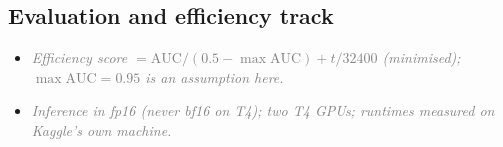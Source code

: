 \documentclass[conference]{IEEEtran}
\newcommand{\nt}[1]{\textcolor{gray}{\textit{#1}}}            %
\begin{document}
\subsection{Evaluation and efficiency track}
\begin{notes}
\begin{itemize}
\item \nt{Efficiency score $=\text{AUC}/(0.5-\max\text{AUC}) + t/32400$ (minimised); $\max\text{AUC}=0.95$ is an
assumption here.}  %
\item \nt{Inference in fp16 (never bf16 on T4); two T4 GPUs; runtimes measured on Kaggle's own machine.}
\end{itemize}
\end{notes}

\end{document}
